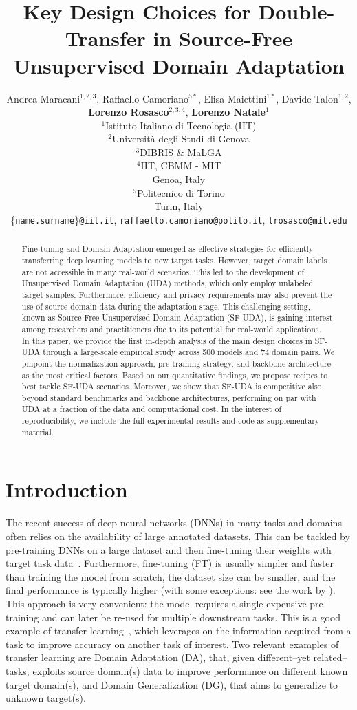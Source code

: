 \documentclass{article}
\title{Key Design Choices for Double-Transfer in Source-Free Unsupervised Domain Adaptation}
\author{%
  Andrea Maracani$^{1, 2, 3}$, Raffaello Camoriano$^{5*}$, Elisa Maiettini$^{1*}$, Davide Talon$^{1, 2}$, \\
  \textbf{Lorenzo Rosasco}$^{2, 3, 4}$, \textbf{Lorenzo Natale}$^1$\\
  $^1$Istituto Italiano di Tecnologia (IIT)\\
  $^2$Università degli Studi di Genova\\
  $^3$DIBRIS \& MaLGA\\
  $^4$IIT, CBMM - MIT\\
 Genoa, Italy \\
  $^5$Politecnico di Torino\\
  Turin, Italy \\
  \{\texttt{name.surname}\}\texttt{@iit.it}, \texttt{raffaello.camoriano@polito.it}, 
  \texttt{lrosasco@mit.edu}
}
\begin{document}
\maketitle
\def\thefootnote{*}\def\thefootnote{\arabic{footnote}}

\begin{abstract}
Fine-tuning and Domain Adaptation emerged as effective strategies for efficiently transferring deep learning models to new target tasks. However, target domain labels are not accessible in many real-world scenarios. This led to the development of Unsupervised Domain Adaptation (UDA) methods, which only employ unlabeled target samples. Furthermore, efficiency and privacy requirements may also prevent the use of source domain data during the adaptation stage. This  challenging setting, known as Source-Free Unsupervised Domain Adaptation (SF-UDA), is gaining interest among researchers and practitioners due to its potential for real-world applications.\\
In this paper, we  provide the first in-depth analysis of the main design choices in SF-UDA through a large-scale empirical study across 500 models and 74 domain pairs. 
We pinpoint the normalization approach, pre-training strategy, and backbone architecture as the most critical factors. 
Based on our  quantitative findings, we propose recipes to best tackle SF-UDA scenarios. 
Moreover, we show that SF-UDA is competitive also beyond standard benchmarks and backbone architectures, performing on par with UDA at a fraction of the data and computational cost. 
In the interest of reproducibility, we include the full experimental results and code as supplementary material.
\end{abstract}


\section{Introduction}
The recent success of deep neural networks (DNNs) in many tasks and domains often relies on the availability of large annotated datasets.
This can be tackled by pre-training DNNs on a large dataset and then fine-tuning their weights with target task data~\citep{huh2016makes, yosinski2014transferable, chu2016best}.
Furthermore, fine-tuning (FT) is usually simpler and faster than training the model from scratch, the dataset size can be smaller, and the final performance is typically higher (with some exceptions: see the work by \cite{kornblith2019better}). 
This approach is very convenient: the model requires a single expensive pre-training and can later be re-used for multiple downstream tasks.
This is a good example of transfer learning~\citep{Zhuang2021Comprehensive}, which
leverages on the information acquired from a  task to improve accuracy on another task of interest.
Two relevant examples of transfer learning are Domain Adaptation (DA), that, given different--yet related--tasks, exploits source domain(s) data to improve performance on different known target domain(s), and Domain Generalization (DG), that aims to generalize to unknown target(s).
\end{document}
